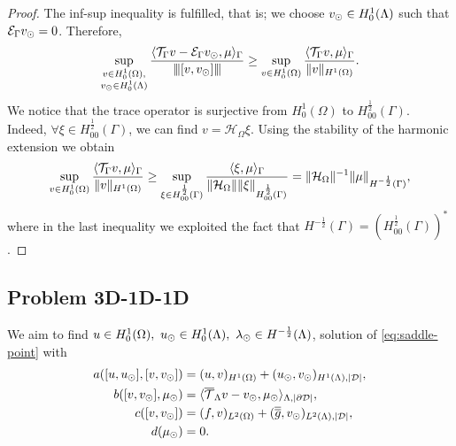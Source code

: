 \documentclass[r]{siamart171218}
\begin{document}
\begin{proof}

The inf-sup inequality is fulfilled, that is; 
we choose $v_{\odot} \in H^1_0(\Lambda)$ such that $\mathcal{E}_\Gamma v_{\odot} =0$. Therefore,
\begin{equation*}
\sup _{\substack{v\in H^1_0(\Omega),\\ v_{\odot} \in H^1_0(\Lambda)}} \frac{ \langle {\mathcal{T}_\Gamma} v  - \mathcal{E}_\Gamma v_{\odot}, \mu\rangle_\Gamma}{{\left\vert\kern-0.25ex\left\vert\kern-0.25ex\left\vert [v, v_{\odot}] \right\vert\kern-0.25ex\right\vert\kern-0.25ex\right\vert}} 
\geq \sup _{v\in H^1_0(\Omega)} \frac{ \langle {\mathcal{T}_\Gamma} v, \mu \rangle_\Gamma}{\|v\|_{H^1(\Omega)}}.
\end{equation*}
We notice that the trace operator is surjective from $H^1_0(\Omega)$ to $H^{\frac12}_{00}(\Gamma)$. Indeed, $\forall \xi \in H^{\frac 12}_{00}(\Gamma)$, 
we  can find $v=\mathcal{H}_\Omega \xi$. Using the stability of the harmonic extension we obtain
\begin{equation}\label{infsup_traceop}
\sup _{v\in H^1_0(\Omega)} \frac{ \langle \trace v, \mu \rangle_\Gamma}{\|v\|_{H^1(\Omega)}}
\geq  \sup _{\xi \in H^{\frac 12}_{00}(\Gamma )} \frac{ \langle \xi , \mu \rangle_\Gamma}{\|\mathcal{H}_\Omega\| \|\xi\|_{H^{\frac 12}_{00}(\Gamma)}}
= \|\mathcal{H}_\Omega\|^{-1} \|\mu\|_{H^{-\frac 12}(\Gamma)},
\end{equation}
where in the last inequality we exploited the fact that $H^{-\frac 12}(\Gamma)=(H^{\frac 12 }_{00}(\Gamma))^*$. 
\end{proof}

\subsection{Problem 3D-1D-1D}
We aim to find $u \in H^1_0(\Omega),\ u_{\odot} \in H^1_0(\Lambda), \ \lambda_{\odot} \in H^{-\frac12}(\Lambda)$,
solution of \eqref{eq:saddle-point} with
\begin{align*}
a([u, u_{\odot}], [v, v_{\odot}])&= (u,v)_{H^1(\Omega)} + (u_{\odot},v_{\odot})_{H^1(\Lambda),|\mathcal{D}|},
\\
b([v, v_{\odot}], \mu_{\odot})&=  \langle  {\overline{\mathcal{T}}_\Lambda} v - v_{\odot}, \mu_{\odot} \rangle_{\Lambda, |\partial\mathcal{D}|},
\\
c([v,v_{\odot}])&= (f,v)_{L^2(\Omega)} + (\overline{\overline{g}},v_{\odot})_{L^2(\Lambda),|\mathcal{D}|},
\\
d(\mu_{\odot})&=0.
\end{align*}
\end{document}
